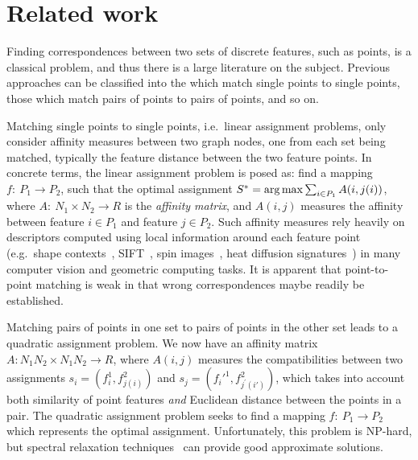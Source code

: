 \section{Related work}
\label{sec:related}

Finding correspondences between two sets of discrete features, such as points, is a classical problem, and thus there is a large literature on the subject.
Previous approaches can be classified into the which match single points to single points, those which match pairs of points to pairs of points, and so on.

Matching single points to single points, i.e.\ linear assignment problems, only consider affinity measures between two graph nodes, one from each set being matched, typically the feature distance between the two feature points.
In concrete terms, the linear assignment problem is posed as: find a mapping $f:\ P_1\to P_2$,
such that the optimal assignment $S^*=\operatorname*{arg\,max}\sum\nolimits_{i\in P_1}A(i,j(i))$,
where $A:\ N_1\times N_2 \to R$ is the \emph{affinity matrix}, and $A(i,j)$ measures the affinity between feature $i\in P_1$ and feature $j\in P_2$.
Such affinity measures rely heavily on descriptors computed using local information around each feature point
(e.g.\ shape contexts~\cite{Belongie02}, SIFT~\cite{Lowe04}, spin images~\cite{Johnson99}, heat diffusion signatures~\cite{Sun09}) in many computer vision and geometric computing tasks.
It is apparent that point-to-point matching is weak in that wrong correspondences maybe readily be established.

Matching pairs of points in one set to pairs of points in the other set leads to a quadratic assignment problem.
We now have an affinity matrix $A: N_1N_2\times N_1N_2 \to R$, where $A(i,j)$ measures the compatibilities between two assignments $s_i=(f_i^1,f_{j(i)}^2)$ and $s_j=(f_i'^1,f_{j^{'}(i')}^2)$,
which takes into account both similarity of point features \emph{and} Euclidean distance between the points in a pair.
The quadratic assignment problem seeks to find a mapping $f:\ P_1\to P_2$ which represents the optimal assignment.
Unfortunately, this problem is NP-hard, but spectral relaxation techniques~\cite{Leordeanu05} can provide good approximate solutions.

